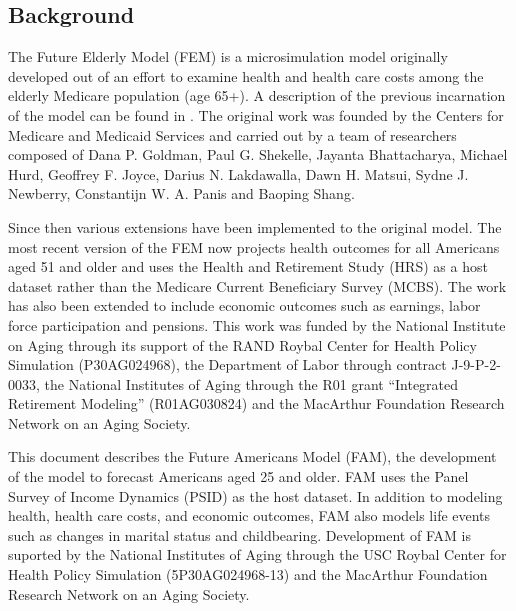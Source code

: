 \subsection{Background}
The Future Elderly Model (FEM) is a microsimulation model originally developed out of an effort to 
examine health and health care costs among the elderly Medicare population (age 65+). A description 
of the previous incarnation of the model can be found in \citet{goldman2004health}. The original work was 
founded by the Centers for Medicare and Medicaid Services and carried out by a team of researchers 
composed of Dana P. Goldman, Paul G. Shekelle, Jayanta Bhattacharya, Michael Hurd, Geoffrey F. Joyce, 
Darius N. Lakdawalla, Dawn H. Matsui, Sydne J. Newberry, Constantijn W. A. Panis and Baoping Shang.

Since then various extensions have been implemented to the original model. The most recent version of the FEM
now projects health outcomes for all Americans aged 51 and older and uses the Health and Retirement 
Study (HRS) as a host dataset rather than the Medicare Current Beneficiary Survey (MCBS).  The work 
has also been extended to include economic outcomes such as earnings, labor force participation and 
pensions. This work was funded by the National Institute on Aging through its support of the RAND 
Roybal Center for Health Policy Simulation (P30AG024968), the Department of Labor through contract 
J-9-P-2-0033, the National Institutes of Aging through the R01 grant ``Integrated Retirement 
Modeling'' (R01AG030824) and the MacArthur Foundation Research Network on an Aging Society. 

This document describes the Future Americans Model (FAM), the development of the model to forecast Americans aged 25 
and older.  FAM uses the Panel Survey of Income Dynamics (PSID) as the host dataset.  In addition to modeling
health, health care costs, and economic outcomes, FAM also models life events such as changes in marital status 
and childbearing.  Development of FAM is suported by the National Institutes of Aging through the USC Roybal 
Center for Health Policy Simulation (5P30AG024968-13) and the MacArthur Foundation Research Network on an Aging Society.
    

